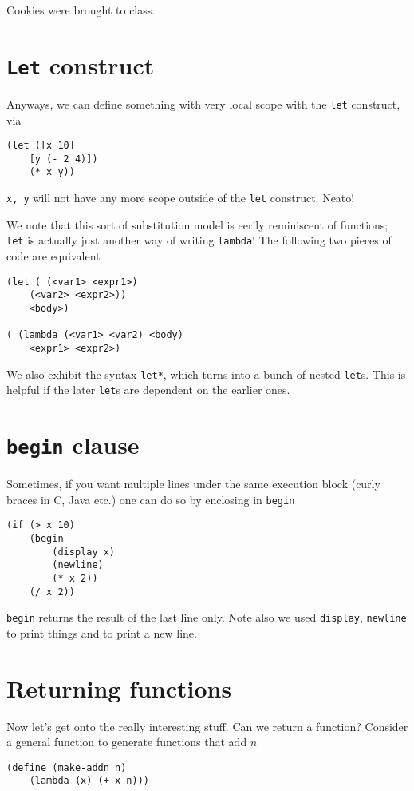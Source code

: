 \documentclass[10pt]{report}
\begin{document}
Cookies were brought to class. 

\section{\texttt{Let} construct}

Anyways, we can define something with very local scope with the \texttt{let} construct, via
\begin{verbatim}
(let ([x 10]
    [y (- 2 4)])
    (* x y))
\end{verbatim}

\texttt{x, y} will not have any more scope outside of the \texttt{let} construct. Neato!

We note that this sort of substitution model is eerily reminiscent of functions; \texttt{let} is actually just another way of writing \texttt{lambda}! The following two pieces of code are equivalent
\begin{verbatim}
(let ( (<var1> <expr1>)
    (<var2> <expr2>))
    <body>)

( (lambda (<var1> <var2) <body)
    <expr1> <expr2>)
\end{verbatim}

We also exhibit the syntax \texttt{let*}, which turns into a bunch of nested \texttt{let}s. This is helpful if the later \texttt{let}s are dependent on the earlier ones.

\section{\texttt{begin} clause}

Sometimes, if you want multiple lines under the same execution block (curly braces in C, Java etc.) one can do so by enclosing in \texttt{begin}
\begin{verbatim}
(if (> x 10)
    (begin
        (display x)
        (newline)
        (* x 2))
    (/ x 2))
\end{verbatim}

\texttt{begin} returns the result of the last line only. Note also we used \texttt{display}, \texttt{newline} to print things and to print a new line.

\section{Returning functions}

Now let's get onto the really interesting stuff. Can we return a function? Consider a general function to generate functions that add $n$
\begin{verbatim}
(define (make-addn n)
    (lambda (x) (+ x n)))
\end{verbatim}
\end{document}

